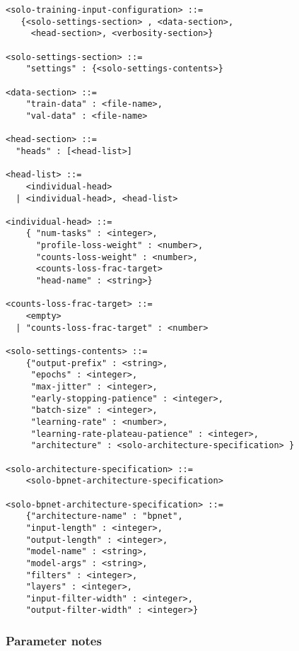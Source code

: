 \documentclass{article}
\begin{document}
\begin{lstlisting}
<solo-training-input-configuration> ::=
   {<solo-settings-section> , <data-section>,
     <head-section>, <verbosity-section>}

<solo-settings-section> ::=
    "settings" : {<solo-settings-contents>}

<data-section> ::=
    "train-data" : <file-name>,
    "val-data" : <file-name>

<head-section> ::=
  "heads" : [<head-list>]

<head-list> ::=
    <individual-head>
  | <individual-head>, <head-list>

<individual-head> ::=
    { "num-tasks" : <integer>,
      "profile-loss-weight" : <number>,
      "counts-loss-weight" : <number>,
      <counts-loss-frac-target>
      "head-name" : <string>}

<counts-loss-frac-target> ::=
    <empty>
  | "counts-loss-frac-target" : <number>

<solo-settings-contents> ::=
    {"output-prefix" : <string>,
     "epochs" : <integer>,
     "max-jitter" : <integer>,
     "early-stopping-patience" : <integer>,
     "batch-size" : <integer>,
     "learning-rate" : <number>,
     "learning-rate-plateau-patience" : <integer>,
     "architecture" : <solo-architecture-specification> }

<solo-architecture-specification> ::=
    <solo-bpnet-architecture-specification>

<solo-bpnet-architecture-specification> ::=
    {"architecture-name" : "bpnet",
    "input-length" : <integer>,
    "output-length" : <integer>,
    "model-name" : <string>,
    "model-args" : <string>,
    "filters" : <integer>,
    "layers" : <integer>,
    "input-filter-width" : <integer>,
    "output-filter-width" : <integer>}
\end{lstlisting}

\subsubsection{Parameter notes}
\end{document}
